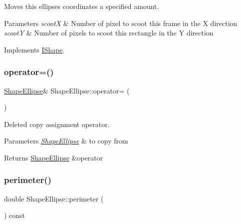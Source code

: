 Moves this ellipse\textquotesingle{}s coordinates a specified amount. 


\begin{DoxyParams}{Parameters}
{\em scootX} & Number of pixel to scoot this frame in the X direction \\
\hline
{\em scootY} & Number of pixels to scoot this rectangle in the Y direction \\
\hline
\end{DoxyParams}


Implements \mbox{\hyperlink{class_i_shape_a3d23494cd34e658cc6b39a2e2db0b7fe}{I\+Shape}}.

\mbox{\label{class_shape_ellipse_ad9859459d9f53eac418601c054cf3289}} 
\subsubsection{\texorpdfstring{operator=()}{operator=()}}
{\footnotesize\ttfamily \mbox{\hyperlink{class_shape_ellipse}{Shape\+Ellipse}}\& Shape\+Ellipse\+::operator= (\begin{DoxyParamCaption}\item[{const \mbox{\hyperlink{class_shape_ellipse}{Shape\+Ellipse}} \&}]{ }\end{DoxyParamCaption})\hspace{0.3cm}{\ttfamily [delete]}}



Deleted copy assignment operator. 


\begin{DoxyParams}{Parameters}
{\em \mbox{\hyperlink{class_shape_ellipse}{Shape\+Ellipse}}} & to copy from \\
\hline
\end{DoxyParams}
\begin{DoxyReturn}{Returns}
\mbox{\hyperlink{class_shape_ellipse}{Shape\+Ellipse}} \&operator 
\end{DoxyReturn}
\mbox{\label{class_shape_ellipse_a397c01c912105854e065f6c2d766f73a}} 
\subsubsection{\texorpdfstring{perimeter()}{perimeter()}}
{\footnotesize\ttfamily double Shape\+Ellipse\+::perimeter (\begin{DoxyParamCaption}{ }\end{DoxyParamCaption}) const\hspace{0.3cm}{\ttfamily [virtual]}}



